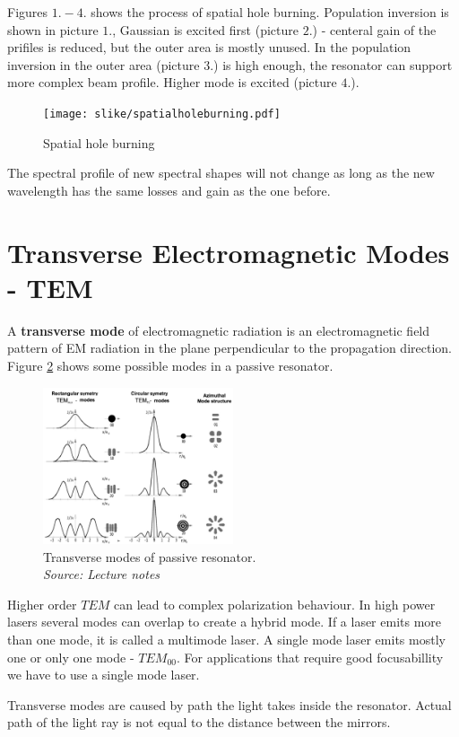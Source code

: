 Figures $1.-4.$ shows the process of spatial hole burning. Population inversion is shown in picture $1.$,  Gaussian is excited first (picture $2.$) - centeral gain of the prifiles is reduced, but the 
outer area is mostly unused. In the population inversion in the outer area (picture $3.$) is high enough, the resonator can 
support more complex beam profile. Higher mode is excited (picture $4.$).

\begin{figure}[h!]
    \centering
    \texttt{[image: slike/spatialholeburning.pdf]}
    \caption{Spatial hole burning}
    \label{fig:shb}
\end{figure}
The spectral profile of new spectral shapes will not change as long as the new wavelength 
has the same losses and gain as the one before. 

\section{Transverse Electromagnetic Modes - TEM}
A \textbf{transverse mode} of electromagnetic radiation is an electromagnetic
field pattern of EM radiation in the plane perpendicular to the propagation direction.
Figure \ref{fig:tmpr} shows some possible modes in a passive resonator.
\begin{figure}[h!]
    \centering
    \includegraphics[width=0.5\textwidth]{slike/TransverseModes.png}
    \caption{Transverse modes of passive resonator.\\ \textit{Source: Lecture notes}}
    \label{fig:tmpr}
\end{figure}
Higher order $TEM$ can lead to complex polarization behaviour. In high power lasers several modes can overlap to create a hybrid mode.
If a laser emits more than one mode, it is called a multimode laser. A single mode laser emits mostly one or only one mode - $TEM_{00}$.
For applications that require good focusabillity we have to use a single mode laser.

Transverse modes are caused by path the light takes inside the resonator.
Actual path of the light ray is not equal to the distance between the mirrors. 


